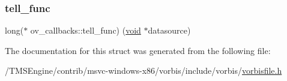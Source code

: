 \subsubsection{\texorpdfstring{tell\+\_\+func}{tell\_func}}
{\footnotesize\ttfamily long($\ast$ ov\+\_\+callbacks\+::tell\+\_\+func) (\hyperlink{_s_d_l__opengles2__gl2ext_8h_ae5d8fa23ad07c48bb609509eae494c95}{void} $\ast$datasource)}



The documentation for this struct was generated from the following file\+:\begin{DoxyCompactItemize}
\item 
/\+T\+M\+S\+Engine/contrib/msvc-\/windows-\/x86/vorbis/include/vorbis/\hyperlink{vorbisfile_8h}{vorbisfile.\+h}\end{DoxyCompactItemize}
